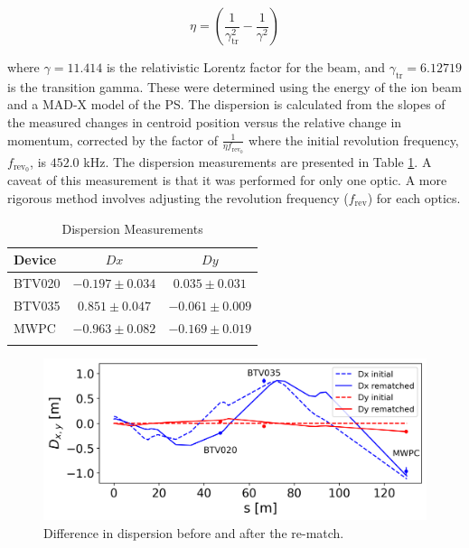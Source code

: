 \documentclass[a4paper,
               biblatex,     %
               ]{jacow}
\begin{document}
\begin{equation}
\eta = \left(\frac{1}{\gamma_{\text{tr}}^{2}} - \frac{1}{\gamma^{2}}\right)
\end{equation}

where $\gamma = 11.414$ is the relativistic Lorentz factor for the beam, and $\gamma_{\text{tr}} = 6.12719$ is the transition gamma. These were determined using the energy of the ion beam and a MAD-X \cite{noauthor_mad_nodate} model of the PS. The dispersion is calculated from the slopes of the measured changes in centroid position versus the relative change in momentum, corrected by the factor of $\frac{1}{\eta f_{\text{rev}_0}}$ where the initial revolution frequency, $f_{\text{rev}_0}$, is $452.0$ kHz. The dispersion measurements are presented in Table \ref{tab:dispersion}. A caveat of this measurement is that it was performed for only one optic. A more rigorous method involves adjusting the revolution frequency ($f_{\text{rev}}$) for each optics.

\begin{table}[h!]
\centering
\caption{Dispersion Measurements}
\begin{tabular}{l c c}
\hline
Device & \(Dx\) & \(Dy\) \\
\hline
BTV020  & \(-0.197 \pm 0.034\) & \(0.035 \pm 0.031\) \\
BTV035  & \(0.851 \pm 0.047\) & \(-0.061 \pm 0.009\) \\
MWPC   & \(-0.963 \pm 0.082\) & \(-0.169 \pm 0.019\) \\
\hline
\label{tab:dispersion}
\end{tabular}
\end{table}

\begin{figure}[!htb]
   \centering
   \includegraphics*[width=1.0\columnwidth]{dispersion_diff.png}
   \caption{Difference in dispersion before and after the re-match.}
   \label{fig:dispersion}
\end{figure}
\end{document}

